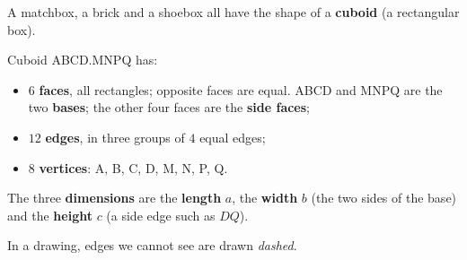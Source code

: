 \gdef\cuboidVT#1#2#3#4{\coordinate (Q) at (0,0); \coordinate (P) at (#1,0); \coordinate (C) at (#1,#3); \coordinate (D) at (0,#3);
 \coordinate (M) at ({0.5*#2},{0.38*#2}); \coordinate (N) at ($(P)+(M)$); \coordinate (B) at ($(C)+(M)$); \coordinate (A) at ($(D)+(M)$);
 \fill[tmBlue!6] (Q)--(P)--(C)--(D)--cycle; \fill[tmBlue!3] (D)--(C)--(B)--(A)--cycle; \fill[tmBlue!13] (P)--(N)--(B)--(C)--cycle;
 \ifdim #4pt>0pt \coordinate (wl) at (0,#4);
  \fill[cyan!30] (Q)--(P)--($(P)+(wl)$)--($(Q)+(wl)$)--cycle; \fill[cyan!45] (P)--(N)--($(N)+(wl)$)--($(P)+(wl)$)--cycle;
  \fill[cyan!16] ($(Q)+(wl)$)--($(P)+(wl)$)--($(N)+(wl)$)--($(M)+(wl)$)--cycle;
  \draw[cyan!60!black,line width=0.5pt] ($(Q)+(wl)$)--($(P)+(wl)$)--($(N)+(wl)$);
  \draw[cyan!60!black,line width=0.4pt,dashed] ($(N)+(wl)$)--($(M)+(wl)$)--($(Q)+(wl)$); \fi
 \draw[geo,dashed,line width=0.6pt] (M)--(Q) (M)--(N) (M)--(A);
 \draw[geo] (Q)--(P)--(C)--(D)--cycle (D)--(A)--(B)--(C) (P)--(N)--(B);}
\begin{knowbox}
\begin{minipage}[t]{0.58\linewidth}
A matchbox, a brick and a shoebox all have the shape of a \textbf{cuboid} (a rectangular box).\par
\smallskip
Cuboid ABCD.MNPQ has:
\begin{itemize}[leftmargin=1.2em,itemsep=1pt,topsep=2pt]
\item $6$ \textbf{faces}, all rectangles; opposite faces are equal. ABCD and MNPQ are the two \textbf{bases}; the other four faces are the \textbf{side faces};
\item $12$ \textbf{edges}, in three groups of $4$ equal edges;
\item $8$ \textbf{vertices}: A, B, C, D, M, N, P, Q.
\end{itemize}
The three \textbf{dimensions} are the \textbf{length} $a$, the \textbf{width} $b$ (the two sides of the base) and the \textbf{height} $c$ (a side edge such as $DQ$).\par
\smallskip
In a drawing, edges we cannot see are drawn \emph{dashed}.
\end{minipage}\hfill
\begin{minipage}[t]{0.38\linewidth}\vspace{4pt}\centering
{}
\end{minipage}
\end{knowbox}
